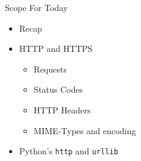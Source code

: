 
\begin{frame}{Scope For Today}
%
\begin{itemize}
\item Recap
\item HTTP and HTTPS
	\begin{itemize}
	\item Requests
	\item Status Codes
	\item HTTP Headers
	\item MIME-Types and encoding
	\end{itemize}
\item Python's \texttt{http} and \texttt{urllib}
\end{itemize}
%
\end{frame}


